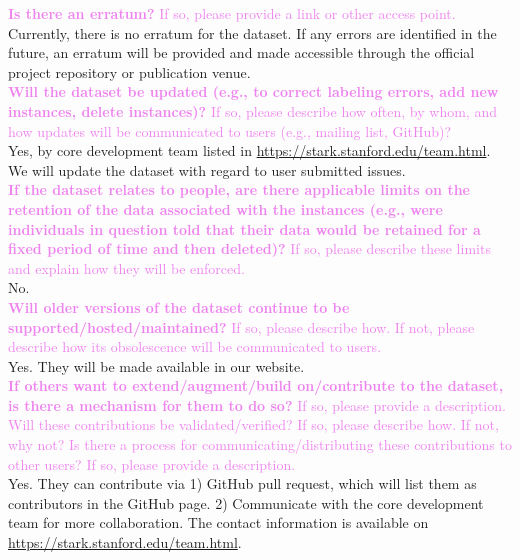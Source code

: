 \documentclass{article}
\newcommand{\sectioncolor}{Violet}
\begin{document}
    \textcolor{\sectioncolor}{\textbf{
    Is there an erratum?
    }
    If so, please provide a link or other access point.
    } \\
    Currently, there is no erratum for the dataset. If any errors are identified in the future, an erratum will be provided and made accessible through the official project repository or publication venue. \\

    \textcolor{\sectioncolor}{\textbf{
    Will the dataset be updated (e.g., to correct labeling errors, add new
    instances, delete instances)?
    }
    If so, please describe how often, by whom, and how updates will be
    communicated to users (e.g., mailing list, GitHub)?
    } \\
    Yes, by core development team listed in \href{https://stark.stanford.edu/team.html}{https://stark.stanford.edu/team.html}. We will update the dataset with regard to user submitted issues.\\

    \textcolor{\sectioncolor}{\textbf{
    If the dataset relates to people, are there applicable limits on the
    retention of the data associated with the instances (e.g., were individuals
    in question told that their data would be retained for a fixed period of
    time and then deleted)?
    }
    If so, please describe these limits and explain how they will be enforced.
    } \\
    No. \\

    \textcolor{\sectioncolor}{\textbf{
    Will older versions of the dataset continue to be
    supported/hosted/maintained?
    }
    If so, please describe how. If not, please describe how its obsolescence
    will be communicated to users.
    } \\
    Yes. They will be made available in our website. \\

    \textcolor{\sectioncolor}{\textbf{
    If others want to extend/augment/build on/contribute to the dataset, is
    there a mechanism for them to do so?
    }
    If so, please provide a description. Will these contributions be
    validated/verified? If so, please describe how. If not, why not? Is there a
    process for communicating/distributing these contributions to other users?
    If so, please provide a description.
    } \\
    Yes. They can contribute via 1) GitHub pull request, which will list them as contributors in the GitHub page. 2) Communicate with the core development team for more collaboration. The contact information is available on \href{https://stark.stanford.edu/team.html}{https://stark.stanford.edu/team.html}. \\
\end{document}
